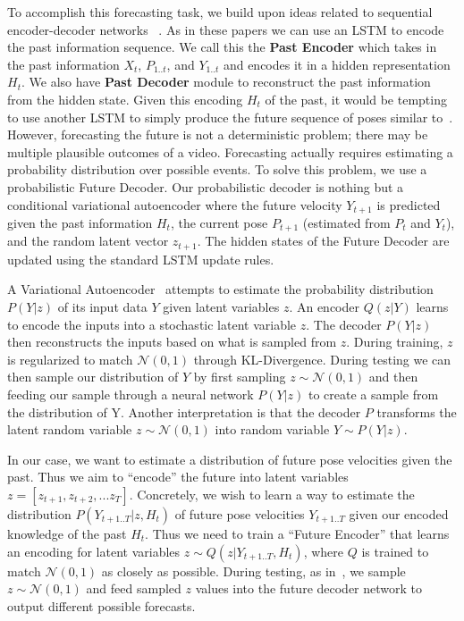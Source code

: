 To accomplish this forecasting task, we build upon ideas related to sequential encoder-decoder networks ~\cite{Srivastava15, Fragikiadaki15}. As in these papers we can use an LSTM to encode the past information sequence. We call this the \textbf{Past Encoder} which takes in the past information $X_t$, $P_{1..t}$, and $Y_{1..t}$ and encodes it in a hidden representation $H_t$. We also have \textbf{Past Decoder} module to reconstruct the past information from the hidden state. Given this encoding $H_t$ of the past, it would be tempting to use another LSTM to simply produce the future sequence of poses similar to~\cite{Srivastava15}. However, forecasting the future is not a deterministic problem; there may be multiple plausible outcomes of a video. Forecasting actually requires estimating a probability distribution over possible events. To solve this problem, we use a probabilistic Future Decoder. Our probabilistic decoder is nothing but a conditional variational autoencoder where the future velocity $Y_{t+1}$ is predicted given the past information $H_t$, the current pose $P_{t+1}$ (estimated from $P_t$ and $Y_t$), and the random latent vector $z_{t+1}$. The hidden states of the Future Decoder are updated using the standard LSTM update rules.

 A Variational Autoencoder~\cite{Kingma14a} attempts to estimate the probability distribution $P(Y|z)$ of its input data $Y$ given latent variables $z$. An encoder $Q(z|Y)$  learns to encode the inputs into a stochastic latent variable $z$. The decoder $P(Y|z)$ then reconstructs the inputs based on what is sampled from $z$. During training, $z$ is regularized to match $\mathcal{N}(0,1)$ through KL-Divergence. During testing we can then sample our distribution of $Y$ by first sampling $z \sim \mathcal{N}(0,1)$ and then feeding our sample through a neural network $P(Y|z)$ to create a sample from the distribution of Y. Another interpretation is that the decoder $P$ transforms the latent random variable $z \sim \mathcal{N}(0,1)$ into random variable $Y \sim P(Y|z)$.

In our case, we want to estimate a distribution of future pose velocities given the past. Thus we aim to ``encode'' the future into latent variables $z = [z_{t+1}, z_{t+2}, ... z_T]$. Concretely, we wish to learn a way to estimate the distribution $P(Y_{t+1..T}|z,H_{t})$ of future pose velocities $Y_{t+1..T}$ given our encoded knowledge of the past $H_{t}$. Thus we need to train a ``Future Encoder'' that learns an encoding for latent variables $z \sim Q(z|Y_{t+1..T},H_{t})$, where $Q$ is trained to match $\mathcal{N}(0,1)$ as closely as possible. 
During testing, as in~\cite{Walker16}, we sample $z \sim \mathcal{N}(0,1)$ and feed sampled $z$ values into the future decoder network to output different possible forecasts.

